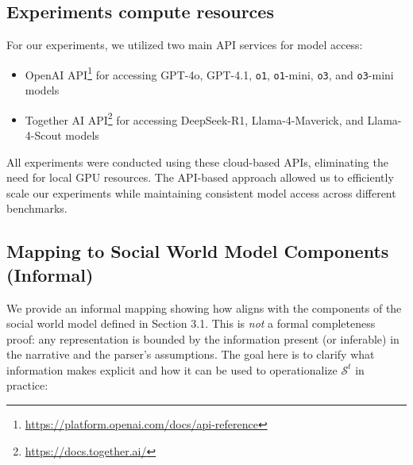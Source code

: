 \subsection{Experiments compute resources}
\label{app:compute_resource}

For our experiments, we utilized two main API services for model access:

\begin{itemize}
    \item OpenAI API\footnote{\url{https://platform.openai.com/docs/api-reference}} for accessing GPT-4o, GPT-4.1, \texttt{o1}, \texttt{o1}-mini, \texttt{o3}, and \texttt{o3}-mini models
    \item Together AI API\footnote{\url{https://docs.together.ai/}} for accessing DeepSeek-R1, Llama-4-Maverick, and Llama-4-Scout models
\end{itemize}

All experiments were conducted using these cloud-based APIs, eliminating the need for local GPU resources. The API-based approach allowed us to efficiently scale our experiments while maintaining consistent model access across different benchmarks.

\subsection{Mapping \protocolname to Social World Model Components (Informal)}
\label{app:proof_of_social_world_state}

We provide an informal mapping showing how \protocolname aligns with the components of the social world model defined in Section 3.1. This is \emph{not} a formal completeness proof: any representation is bounded by the information present (or inferable) in the narrative and the parser’s assumptions. The goal here is to clarify what information \protocolname makes explicit and how it can be used to operationalize $\mathcal{S}^t$ in practice:

